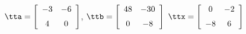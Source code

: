 {$\tta = \left[ \begin {array}{cc} -3&-6 \\ \noalign{\medskip} 4&0 \end {array} \right] $, 
 \quad
$\ttb=\left[ \begin {array}{cc} 48&-30\\ \noalign{\medskip} 0&-8  \end {array} \right] $}
{$\ttx=\left[ \begin {array}{cc} 0&-2\\ \noalign{\medskip} -8&6  \end {array} \right] $}
